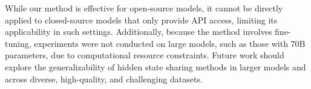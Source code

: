 While our method is effective for open-source models, it cannot be directly applied to closed-source models that only provide API access, limiting its applicability in such settings. Additionally, because the method involves fine-tuning, experiments were not conducted on large models, such as those with 70B parameters, due to computational resource constraints. Future work should explore the generalizability of hidden state sharing methods in larger models and across diverse, high-quality, and challenging datasets. 

